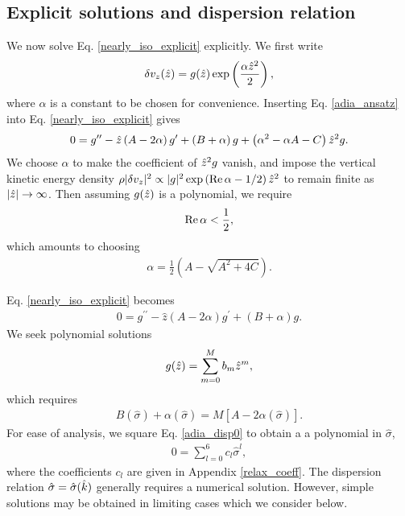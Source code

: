 \subsection{Explicit solutions and dispersion relation}\label{disp_relax}
We now solve Eq. \ref{nearly_iso_explicit} explicitly. We first write  
\begin{align}
  \delta v_z(\hat{z}) =
  g(\hat{z})\exp\left(\frac{\alpha\hat{z}^2}{2}\right), \label{adia_ansatz}
\end{align}
where $\alpha$ is a constant to be chosen for convenience. Inserting
Eq. \ref{adia_ansatz} into Eq. \ref{nearly_iso_explicit} gives
\begin{align}
  0 = g^{\prime\prime} - \hat{z}\left(A - 2\alpha\right)g^\prime + \left(B +
    \alpha\right)g
  +\left(\alpha^2 - \alpha A - C\right)\hat{z}^2 g.
\end{align}
We choose $\alpha$ to make the coefficient of $\hat{z}^2g$
vanish, and impose the vertical kinetic energy density
$\rho|\delta v_z|^2\propto |g|^2 \exp{\left(\operatorname{Re}\alpha -
    1/2\right)\hat{z}^2}$ to remain finite as $|\hat{z}|\to\infty$. 
Then assuming $g(\hat{z})$ is a polynomial, we require  
\begin{align}
  \operatorname{Re}\alpha < \frac{1}{2}, 
\end{align}
which amounts to choosing 
\begin{align}
  \alpha = \frac{1}{2}\left(A - \sqrt{A^2 + 4C}\right).  
\end{align} 

Eq. \ref{nearly_iso_explicit} becomes 
\begin{align}
  0 = g^{\prime\prime} - \hat{z}\left(A - 2\alpha\right)g^\prime +
  \left(B + \alpha\right)g.
\end{align}
We seek polynomial solutions 
\begin{align}
  g(\hat{z}) = \sum_{m=0}^M b_m \hat{z}^m,
\end{align}
which requires
\begin{align}
  B(\hat{\sigma}) + \alpha(\hat{\sigma}) =
  M\left[A-2\alpha(\hat{\sigma})\right].\label{adia_disp0} 
\end{align}
For ease of analysis, we square Eq. \ref{adia_disp0} to obtain a 
a polynomial in $\hat{\sigma}$,  
\begin{align}
  0 = \sum_{l=0}^{6}c_l\hat{\sigma}^l,\label{relax_disp}
\end{align}
where the coefficients $c_l$ are given in Appendix \ref{relax_coeff}.
The dispersion relation $\hat{\sigma}=\hat{\sigma}(\hat{k})$ generally
requires a numerical solution. However, simple solutions may be
obtained in limiting cases which we consider below. 

